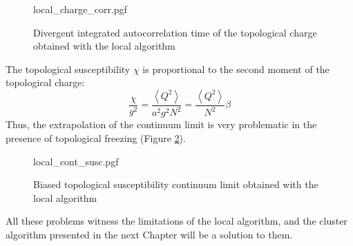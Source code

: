 \begin{figure}[!htb]
    \centering
    {local_charge_corr.pgf}
    \caption{Divergent integrated autocorrelation time of the topological charge obtained with the local algorithm}
    \label{fig:local_charge_corr}
\end{figure}

The topological susceptibility $\chi$ is proportional to the second moment of the topological charge:
\[
    \frac{\chi}{g^2} = \frac{\left<Q^2\right>}{a^2g^2N^2} = \frac{\left<Q^2\right>}{N^2}\beta
\]
Thus, the extrapolation of the continuum limit is very problematic in the presence of topological freezing (Figure \ref{fig:local_cont_susc}).

\begin{figure}[!htb]
    \centering
    {local_cont_susc.pgf}
    \caption{Biased topological susceptibility continuum limit obtained with the local algorithm}
    \label{fig:local_cont_susc}
\end{figure}

All these problems witness the limitations of the local algorithm, and the cluster algorithm presented in the next Chapter will be a solution to them.

